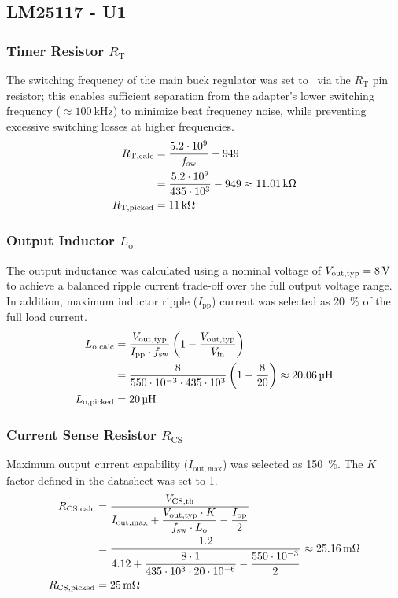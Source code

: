 \subsection{LM25117 - U1}
\subsubsection{Timer Resistor \texorpdfstring{$R_\mathrm{T}$}{Rt}}
The switching frequency of the main buck regulator was set to \uoneFswSI\ via the $R_\mathrm{T}$ pin resistor; this enables sufficient separation from the adapter's lower switching frequency ($\approx \qty{100}{\kilo\hertz}$) to minimize beat frequency noise, while preventing excessive switching losses at higher frequencies.
\begin{align}
    R_\mathrm{T,calc}   &= \frac{5.2 \cdot 10^9}{f_\mathrm{sw}} - 949 \nonumber\\
                        &= \frac{5.2 \cdot 10^9}{435 \cdot 10^{3}} - 949 \approx \qty{11.01}{\kilo\ohm} \nonumber\\
    R_\mathrm{T,picked} &= \qty{11}{\kilo\ohm}
\end{align}

\subsubsection{Output Inductor \texorpdfstring{$L_\mathrm{o}$}{Lo}}
The output inductance was calculated using a nominal voltage of $V_\mathrm{out,typ} = \qty{8}{\volt}$ to achieve a balanced ripple current trade-off over the full output voltage range.
In addition, maximum inductor ripple ($I_\mathrm{pp}$) current was selected as \qty{20}{\percent} of the full load current.
\begin{align}
    L_\mathrm{o,calc}   &= \frac{V_\mathrm{out,typ}}{I_\mathrm{pp} \cdot f_\mathrm{sw}} \left(1 - \frac{V_\mathrm{out,typ}}{V_\mathrm{in}} \right) \nonumber\\
                        &= \frac{\uoneVoutTyp}{\uoneIpp \cdot \uoneFsw} \left(1 - \frac{\uoneVoutTyp}{\boardVin} \right) \approx \uoneLoCalcSI \nonumber\\
    L_\mathrm{o,picked} &= \uoneLoSI
\end{align}

\subsubsection{Current Sense Resistor \texorpdfstring{$R_\mathrm{CS}$}{Rcs}}
Maximum output current capability ($I_\mathrm{out,max}$) was selected as \qty{150}{\percent}. The $K$ factor defined in the datasheet was set to 1.
\begin{align}
    R_\mathrm{CS,calc}   &= \frac{V_\mathrm{CS,th}}{I_\mathrm{out,max} + \dfrac{V_\mathrm{out,typ} \cdot K}{f_\mathrm{sw} \cdot L_\mathrm{o}} - \dfrac{I_\mathrm{pp}}{2}} \nonumber\\
                         &= \frac{1.2}{4.12 + \dfrac{8 \cdot 1}{435 \cdot 10^{3} \cdot 20 \cdot 10^{-6}} - \dfrac{550 \cdot 10^{-3}}{2}} \approx \qty{25.16}{\milli\ohm} \nonumber\\
    R_\mathrm{CS,picked} &= \qty{25}{\milli\ohm}
\end{align}

